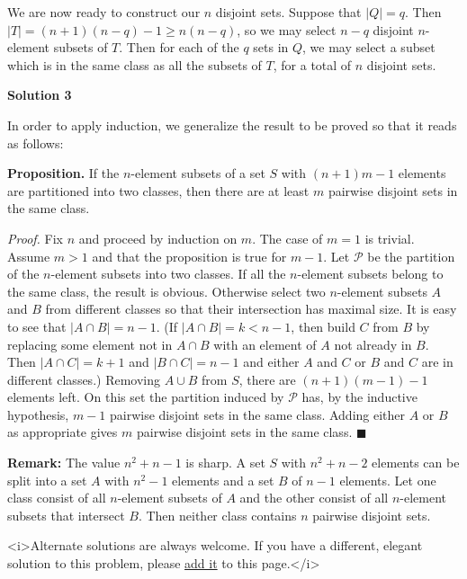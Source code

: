 \begin{enumerate}
 We are now ready to construct our $n$ disjoint sets. Suppose that $|Q| = q$. Then $|T| = (n+1)(n-q) - 1 \geq n(n-q)$, so we may select $n - q$ disjoint $n$-element subsets of $T$. Then for each of the $q$ sets in $Q$, we may select a subset which is in the same class as all the subsets of $T$, for a total of $n$ disjoint sets.

 



\textbf{Solution 3}

In order to apply induction, we generalize the result to be proved so that it reads as follows:

 \textbf{Proposition.} If the $n$-element subsets of a set $S$ with $(n + 1)m - 1$ elements are partitioned into two classes, then there are at least $m$ pairwise disjoint sets in the same class.

 \textit{Proof.} Fix $n$ and proceed by induction on $m$. The case of $m = 1$ is trivial. Assume $m > 1$ and that the proposition is true for $m - 1$. Let $\mathcal{P}$ be the partition of the $n$-element subsets into two classes. If all the $n$-element subsets belong to the same class, the result is obvious. Otherwise select two $n$-element subsets $A$ and $B$ from different classes so that their intersection has maximal size. It is easy to see that $|A\cap B| = n - 1$. (If $|A\cap B| = k < n - 1$, then build $C$ from $B$ by replacing some element not in $A\cap B$ with an element of $A$ not already in $B$. Then $|A\cap C| = k + 1$ and $|B\cap C| = n - 1$ and either $A$ and $C$ or $B$ and $C$ are in different classes.) Removing $A\cup B$ from $S$, there are $(n + 1)(m - 1) - 1$ elements left. On this set the partition induced by $\mathcal{P}$ has, by the inductive hypothesis, $m - 1$ pairwise disjoint sets in the same class. Adding either $A$ or $B$ as appropriate gives $m$ pairwise disjoint sets in the same class. $\blacksquare$

 \textbf{Remark:} The value $n^2 + n - 1$ is sharp. A set $S$ with $n^2 + n - 2$ elements can be split into a set $A$ with $n^2 - 1$ elements and a set $B$ of $n - 1$ elements. Let one class consist of all $n$-element subsets of $A$ and the other consist of all $n$-element subsets that intersect $B$. Then neither class contains $n$ pairwise disjoint sets.

 


 <i>Alternate solutions are always welcome. If you have a different, elegant solution to this problem, please \href{https://artofproblemsolving.com/wiki/index.php?title=2007\_USAMO\_Problems/Problem\_3&action=edit}{add it} to this page.</i>




\end{enumerate}
